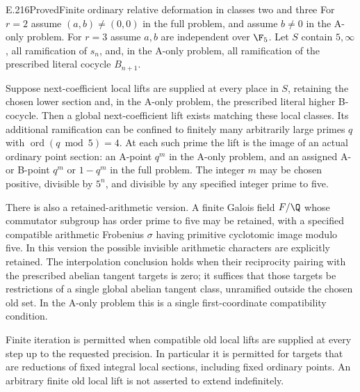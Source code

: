 \begin{result}{E.216}{Proved}{Finite ordinary relative deformation in classes two and three}
For $r=2$ assume $(a,b)\ne(0,0)$ in the full problem, and assume $b\ne0$ in the A-only problem. For $r=3$ assume $a,b$ are independent over $\F_5$. Let $S$ contain $5,\infty$, all ramification of $s_n$, and, in the A-only problem, all ramification of the prescribed literal cocycle $B_{n+1}$.

Suppose next-coefficient local lifts are supplied at every place in $S$, retaining the chosen lower section and, in the A-only problem, the prescribed literal higher B-cocycle. Then a global next-coefficient lift exists matching these local classes. Its additional ramification can be confined to finitely many arbitrarily large primes $q$ with $\operatorname{ord}(q\bmod5)=4$. At each such prime the lift is the image of an actual ordinary point section: an A-point $q^m$ in the A-only problem, and an assigned A- or B-point $q^m$ or $1-q^m$ in the full problem. The integer $m$ may be chosen positive, divisible by $5^n$, and divisible by any specified integer prime to five.

There is also a retained-arithmetic version. A finite Galois field $F/\Q$ whose commutator subgroup has order prime to five may be retained, with a specified compatible arithmetic Frobenius $\sigma$ having primitive cyclotomic image modulo five. In this version the possible invisible arithmetic characters are explicitly retained. The interpolation conclusion holds when their reciprocity pairing with the prescribed abelian tangent targets is zero; it suffices that those targets be restrictions of a single global abelian tangent class, unramified outside the chosen old set. In the A-only problem this is a single first-coordinate compatibility condition.

Finite iteration is permitted when compatible old local lifts are supplied at every step up to the requested precision. In particular it is permitted for targets that are reductions of fixed integral local sections, including fixed ordinary points. An arbitrary finite old local lift is not asserted to extend indefinitely.
\end{result}

